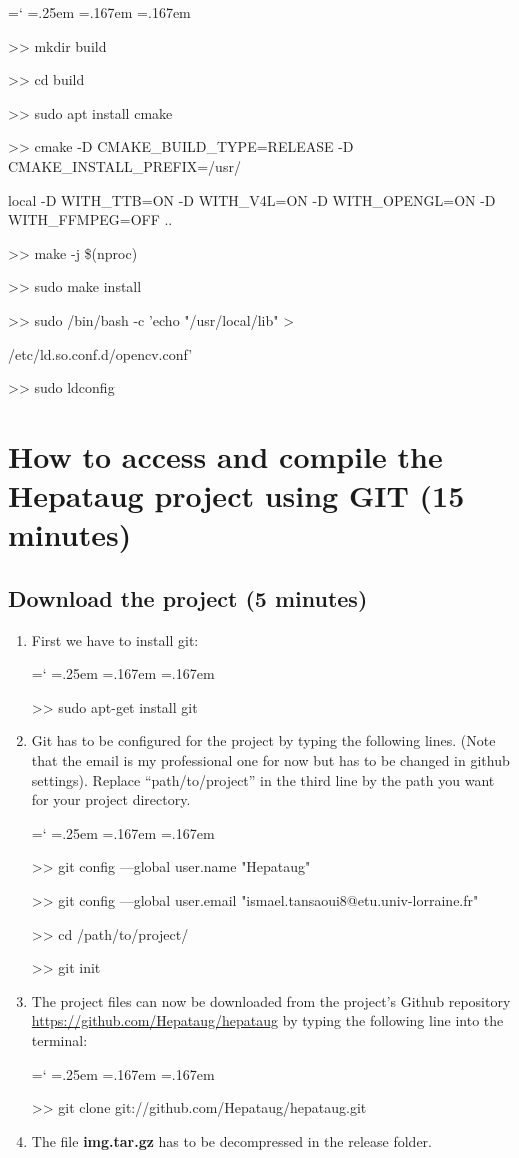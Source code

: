 \documentclass[12pt]{report}
\DeclareRobustCommand*{\ttfamily}{
  \origttfamily
  \hyphenchar\font=`\-\relax
  \fontdimen3\font=.25em\relax
  \fontdimen4\font=.167em\relax
  \fontdimen7\font=.167em\relax
}
\newenvironment{code}{\ttfamily}{}
\begin{document}
\begin{enumerate}
\begin{code}
>> mkdir build

>> cd build

>> sudo apt install cmake

>> cmake -D CMAKE\_BUILD\_TYPE=RELEASE -D CMAKE\_INSTALL\_PREFIX=/usr/

local -D WITH\_TTB=ON -D WITH\_V4L=ON -D WITH\_OPENGL=ON -D WITH\_FFMPEG=OFF ..

>> make -j \$(nproc)

>> sudo make install

>> sudo /bin/bash -c 'echo "/usr/local/lib" >

/etc/ld.so.conf.d/opencv.conf'

>> sudo ldconfig
\end{code}
\end{enumerate}


\chapter{How to access and compile the Hepataug project using GIT (15 minutes)} \label{sec:how to access and compile the Hepataug project} 

\section{Download the project (5 minutes)}
\begin{enumerate}
\item First we have to install git:

\begin{code}
>> sudo apt-get install git
\end{code}


\item Git has to be configured for the project by typing the following lines. (Note that the email is my professional one for now but has to be changed in github settings). Replace ``path/to/project'' in the third line by the path you want for your project directory.

\begin{code}
>> git config ---global user.name "Hepataug"

>> git config ---global user.email "ismael.tansaoui8@etu.univ-lorraine.fr"

>> cd /path/to/project/

>> git init
\end{code}


\item The project files can now be downloaded from the project's Github repository \url{https://github.com/Hepataug/hepataug} by typing the following line into the terminal:

\begin{code}
>> git clone git://github.com/Hepataug/hepataug.git
\end{code}


\item The file \textbf{img.tar.gz} has to be decompressed in the release folder.
\end{enumerate}
\end{document}
